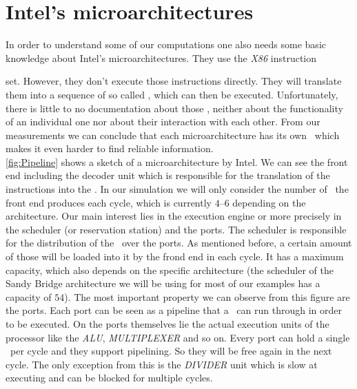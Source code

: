\section{Intel's microarchitectures}



In order to understand some of our computations one also needs some basic knowledge about Intel's microarchitectures. They use the \emph{X86} instruction


set. However, they don't execute those instructions directly. They will translate them into a sequence of so called \microops, which can then be executed. Unfortunately, there is little to no documentation about those \microops, neither about the functionality of an individual one nor about their interaction with each other. From our measurements we can conclude that each microarchitecture has its own \microops\ which makes it even harder to find reliable information.\\ \autoref{fig:Pipeline} shows a sketch of a microarchitecture by Intel. We can see the front end including the decoder unit which is responsible for the translation of the instructions into the \microops. In our simulation we will only consider the number of \microops\ the front end produces each cycle, which is currently $4$--$6$ depending on the architecture. Our main interest lies in the execution engine or more precisely in the scheduler (or reservation station) and the ports. The scheduler is responsible for the distribution of the \microops\ over the ports. As mentioned before, a certain amount of those will be loaded into it by the frond end in each cycle. It has a maximum capacity, which also depends on the specific architecture (the scheduler of the Sandy Bridge architecture we will be using for most of our examples has a capacity of $54$). The most important property we can observe from this figure are the ports. Each port can be seen as a pipeline that a \microop\ can run through in order to be executed. On the ports themselves lie the actual execution units of the processor like the \emph{ALU}, \emph{MULTIPLEXER} and so on. Every port can hold a single \microop\ per cycle and they support pipelining. So they will be free again in the next cycle. The only exception from this is the \emph{DIVIDER} unit which is slow at executing and can be blocked for multiple cycles.
 
 

